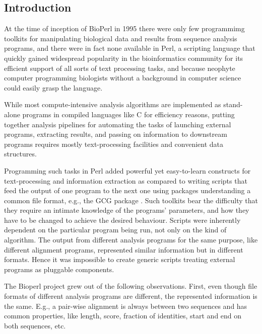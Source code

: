 \documentclass{article}
\begin{document}
\begin{twocolumn}
\begin{abstract}
{\bf Availability:} BioPerl is available as open-source software free
of charge at http://www.bioperl.org/.

\end{abstract}

\section{Introduction}
At the time of inception of BioPerl in 1995 there were only few
programmimg toolkits for manipulating biological data and results from
sequence analysis programs, and there were in fact none available in
Perl, a scripting language that quickly gained widespread popularity
in the bioinformatics community for its efficient support of all sorts
of text processing tasks, and because neophyte computer programming
biologists without a background in computer science could easily grasp
the language.

While most compute-intensive analysis algorithms are implemented as
stand-alone programs in compiled languages like C for efficiency
reasons, putting together analysis pipelines for automating the tasks
of launching external programs, extracting results, and passing on
information to downstream programs requires mostly text-processing
facilities and convenient data structures.

Programming such tasks in Perl added powerful yet easy-to-learn
constructs for text-processing and information extraction as compared
to writing scripts that feed the output of one program to the next one
using packages understanding a common file format, e.g., the GCG
package \cite{GCG}. Such toolkits bear the difficulty that they
require an intimate knowledge of the programs' parameters, and how
they have to be changed to achieve the desired behaviour. Scripts were
inherently dependent on the particular program being run, not only on
the kind of algorithm. The output from different analysis programs for
the same purpose, like different alignment programs, represented
similar information but in different formats. Hence it was impossible
to create generic scripts treating external programs as pluggable
components.

The Bioperl project grew out of the following observations. First,
even though file formats of different analysis programs are different,
the represented information is the same. E.g., a pair-wise alignment
is always between two sequences and has common properties, like
length, score, fraction of identities, start and end on both
sequences, etc. 


\end{twocolumn}
\end{document}
